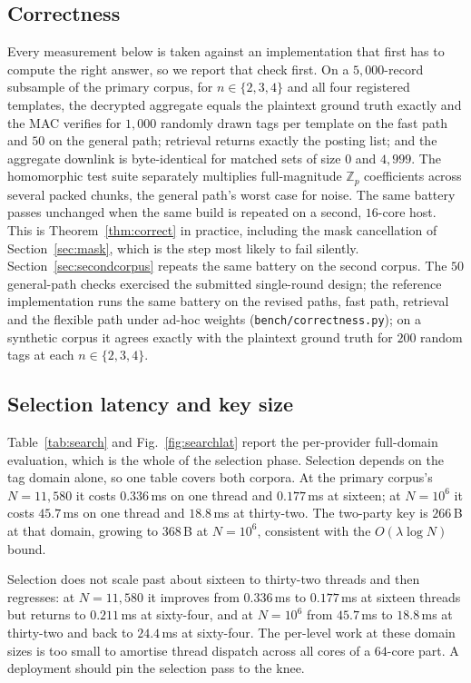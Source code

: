 \documentclass[a4paper,fleqn]{cas-dc}
\newif\ifauthorchecks
\newcommand{\authorcheck}[1]{\ifauthorchecks{\color{red}\textsf{[Authors: #1]}}\fi}
\begin{document}
\subsection{Correctness}
\label{sec:correctness}
Every measurement below is taken against an implementation that first has to
compute the right answer, so we report that check first. On a
$5{,}000$-record subsample of the primary corpus, for $n\in\{2,3,4\}$ and all
four registered templates, the decrypted aggregate equals the plaintext ground
truth exactly and the MAC verifies for $1{,}000$ randomly drawn tags per
template on the fast path and $50$ on the general path; retrieval returns
exactly the posting list; and the aggregate downlink is byte-identical for
matched sets of size $0$ and $4{,}999$. The homomorphic test suite separately
multiplies full-magnitude $\mathbb{Z}_p$ coefficients across several packed
chunks, the general path's worst case for noise. The same battery passes
unchanged when the same build is repeated on a second, $16$-core host. This is Theorem~\ref{thm:correct} in practice, including the mask
cancellation of Section~\ref{sec:mask}, which is the step most likely to fail
silently. Section~\ref{sec:secondcorpus} repeats the same battery on the
second corpus. The $50$ general-path checks exercised the submitted
single-round design; the reference implementation runs the same battery on
the revised paths, fast path, retrieval and the flexible path under ad-hoc
weights (\texttt{bench/correctness.py}); on a synthetic corpus it agrees
exactly with the plaintext ground truth for $200$ random tags at each
$n\in\{2,3,4\}$.
\authorcheck{Run bench/correctness.py on both real corpora (it needs the raw
files, see data/README.md) and report the counts here.}

\subsection{Selection latency and key size}
Table~\ref{tab:search} and Fig.~\ref{fig:searchlat} report the per-provider
full-domain evaluation, which is the whole of the selection phase. Selection
depends on the tag domain alone, so one table covers both corpora. At the
primary corpus's $N=11{,}580$ it costs $0.336$\,ms on one thread and
$0.177$\,ms at sixteen; at $N=10^6$ it costs $45.7$\,ms on one thread and
$18.8$\,ms at thirty-two. The two-party key is $266$\,B at that domain,
growing to $368$\,B at $N=10^6$, consistent with the $O(\lambda\log N)$ bound.

Selection does not scale past about sixteen to thirty-two threads and then
regresses: at $N=11{,}580$ it improves from $0.336$\,ms to $0.177$\,ms at
sixteen threads but returns to $0.211$\,ms at sixty-four, and at $N=10^6$ from
$45.7$\,ms to $18.8$\,ms at thirty-two and back to $24.4$\,ms at sixty-four.
The per-level work at these domain sizes is too small to amortise thread
dispatch across all cores of a $64$-core part. A deployment should pin the
selection pass to the knee.
\end{document}
